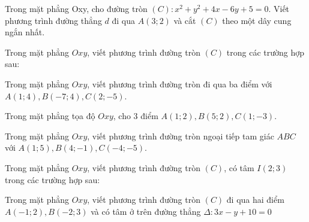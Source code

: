 \documentclass[12pt,a4paper]{book}
\begin{document}
\begin{ex}
Trong mặt phẳng Oxy, cho đường tròn $(C): x^2 + y^2 + 4x - 6y + 5 = 0$. Viết phương trình đường thẳng $ d $ đi qua $A(3;2)$ và cắt $(C)$ theo một dây cung ngắn nhất.
\end{ex}

\begin{ex}
Trong mặt phẳng $Oxy$, viết phương trình đường tròn $(C)$ trong các trường hợp sau:
\loigiai{}
\end{ex}

\begin{ex}
Trong mặt phẳng $Oxy$, viết phương trình đường tròn đi qua ba điểm với $A(1;4), B(-7;4), C(2;-5)$.
\loigiai{}
\end{ex}

\begin{ex}
Trong mặt phẳng tọa độ $Oxy$, cho 3 điểm $A(1;2), B(5;2), C(1;-3)$.
\loigiai{}
\end{ex}

\begin{ex}
Trong mặt phẳng $Oxy$, viết phương trình đường tròn ngoại tiếp tam giác $ABC$ với $A(1;5), B(4;-1), C(-4;-5)$.
\loigiai{}
\end{ex}

\begin{ex}
Trong mặt phẳng $Oxy$, viết phương trình đường tròn $(C)$, có tâm $I(2;3)$ trong các trường hợp sau:
\loigiai{}
\end{ex}

\begin{ex}
Trong mặt phẳng $Oxy$, viết phương trình đường tròn $(C)$ đi qua hai điểm $A(-1;2), B(-2;3)$ và có tâm ở trên đường thẳng $\Delta : 3x-y+10=0$
\loigiai{}
\end{ex}
\end{document}
